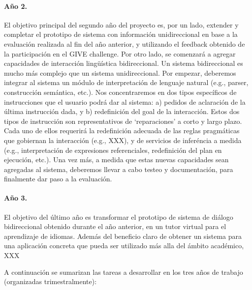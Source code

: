 \paragraph{A\~no 2.} El objetivo principal del segundo a\~no del proyecto es,
por un lado, extender y completar el prototipo de sistema con informaci\'on
unidireccional en base a la evaluaci\'on realizada al fin del a\~no anterior,
y utilizando el feedback obtenido de la
participaci\'on en el GIVE challenge.  Por otro lado, se comenzar\'a a agregar
capacidades de interacci\'on ling\"u\'istica bidireccional.  Un sistema
bidireccional es mucho m\'as complejo que un sistema unidireccional.  Por
empezar, deberemos integrar al sistema un m\'odulo de interpretaci\'on de
lenguaje natural (e.g., parser, construcci\'on sem\'antica, etc.).  Nos
concentraremos en dos tipos espec\'ificos de instrucciones que el usuario
podr\'a dar al sistema: a) pedidos de aclaraci\'on de la \'ultima
instrucci\'on dada, y b) redefinici\'on del goal de la interacci\'on.  Estos
dos tipos de instrucci\'on son representativos de `reparaciones' a corto y
largo plazo.  Cada uno de ellos requerir\'a la redefinici\'on adecuada de
las reglas pragm\'aticas que gobiernan la interacci\'on (e.g., XXX),  y de servicios
de infer\'encia a medida (e.g., interpretaci\'on de expresiones referenciales,
redefinici\'on del plan en ejecuci\'on, etc.).  Una vez m\'as, a medida que
estas nuevas capacidades sean agregadas al sistema, deberemos llevar a
cabo testeo y documentaci\'on, para finalmente dar paso a la evaluaci\'on.



\paragraph{A\~no 3.} El objetivo del \'ultimo a\~no es transformar el prototipo
de sistema de di\'alogo bidireccional obtenido durante el a\~no anterior, en un
tutor virtual para el aprendizaje de idiomas.  Adem\'as del beneficio claro de
obtener un sistema para una aplicaci\'on concreta que pueda ser utilizado
m\'as alla del \'ambito acad\'emico, XXX 

\medskip

\noindent
A continuaci\'on se sumarizan las tareas a desarrollar en los tres a\~nos de
trabajo (organizadas trimestralmente):

